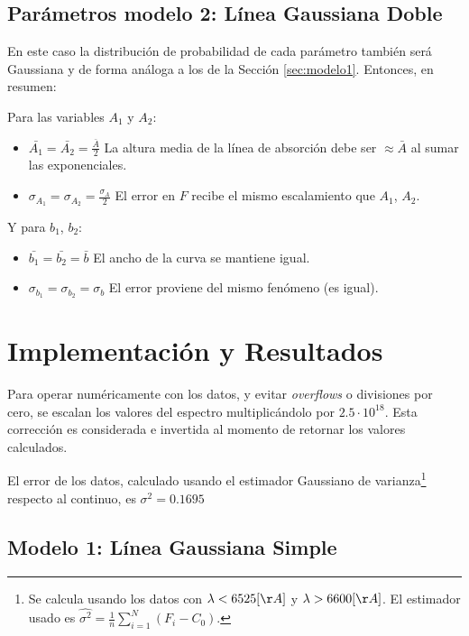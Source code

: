 \documentclass{article}
\begin{document}
\subsection{Parámetros modelo 2: Línea Gaussiana Doble}
\label{sec:modelo2}
En este caso la distribución de probabilidad de cada parámetro también será Gaussiana y de forma análoga a los de la Sección \ref{sec:modelo1}. Entonces, en resumen:

Para las variables $A_1$ y $A_2$:
\begin{itemize}
  \item $\bar{A_1} = \bar{A_2} = \frac{\bar{A}}{2}$ La altura media de la línea de absorción debe ser $\approx \bar{A}$ al sumar las exponenciales.
  
  \item $\sigma_{A_1} = \sigma_{A_2} = \frac{\sigma_A}{2}$ El error en $F$ recibe el mismo escalamiento que $A_1$, $A_2$.
\end{itemize}

Y para $b_1$, $b_2$:

\begin{itemize}
  \item $\bar{b_1} = \bar{b_2} = \bar{b}$ El ancho de la curva se mantiene igual.
  
  \item $\sigma_{b_1} = \sigma_{b_2} = \sigma_b$ El error proviene del mismo fenómeno (es igual).
\end{itemize}

\section{Implementación y Resultados}

Para operar numéricamente con los datos, y evitar \emph{overflows} o divisiones por cero, se escalan los valores del espectro multiplicándolo por $2.5 \cdot 10^{18}$. Esta corrección es considerada e invertida al momento de retornar los valores calculados.

El error de los datos, calculado usando el estimador Gaussiano de varianza\footnote{Se calcula usando los datos con $\lambda < 6525[\AA]$ y $\lambda > 6600[\AA]$. El estimador usado es $\hat{\sigma^2} = \frac{1}{n} \sum\limits_{i=1}^N (F_i - C_0)$.} respecto al continuo, es $\sigma^2 = 0.1695$ 

\subsection{Modelo 1: Línea Gaussiana Simple}
\end{document}
